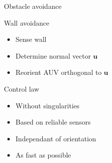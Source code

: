 \documentclass[10pt, xcolor={usenames, dvipsnames}]{beamer}
\begin{document}
        \begin{frame}{Obstacle avoidance}
            \begin{minipage}{0.55\textwidth}
                \begin{block}{Wall avoidance}
                    \vspace{0.2cm}
                    \begin{itemize}
                        \item Sense wall \\
                        \item Determine normal vector $\mathbf{u}$ \\
                        \item Reorient AUV orthogonal to $\mathbf{u}$
                    \end{itemize}
                \end{block}
                \begin{block}{Control law}
                    \begin{itemize}
                        \item Without singularities \\
                        \item Based on reliable sensors \\
                        \item Independant of orientation \\
                        \item As fast as possible
                    \end{itemize}
                \end{block}
            \end{minipage}
        \end{frame}
\end{document}
